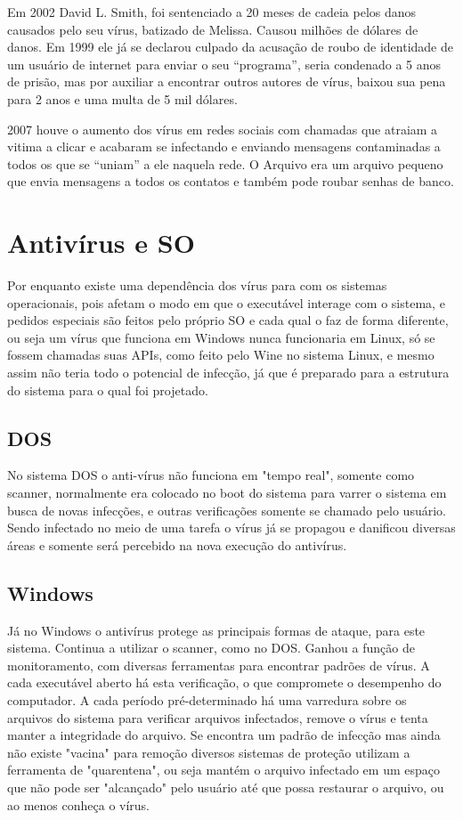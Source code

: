 	Em 2002 David L. Smith, foi sentenciado a 20 meses de cadeia pelos danos causados pelo seu vírus, batizado de Melissa. Causou milhões de dólares de danos. Em 1999 ele já se declarou culpado da acusação de roubo de identidade de um usuário de internet para enviar o seu “programa”, seria condenado a 5 anos de prisão, mas por auxiliar a encontrar outros autores de vírus, baixou sua pena para 2 anos e uma multa de 5 mil dólares.

	2007 houve o aumento dos vírus em redes sociais com chamadas que atraiam a vitima a clicar e acabaram se infectando e enviando mensagens contaminadas a todos os que se “uniam” a ele naquela rede. O Arquivo era um arquivo pequeno que envia mensagens a todos os contatos e também pode roubar senhas de banco.

\section{Antivírus e SO}
	Por enquanto existe uma dependência dos vírus para com os sistemas operacionais, pois afetam o modo em que o executável interage com o sistema, e pedidos especiais são feitos pelo próprio SO e cada qual o faz de forma diferente, ou seja um vírus que funciona em Windows nunca funcionaria em Linux, só se fossem chamadas suas APIs, como feito pelo Wine no sistema Linux, e mesmo assim não teria todo o potencial de infecção, já que é preparado para a estrutura do sistema para o qual foi projetado.

\subsection{DOS}
	No sistema DOS o anti-vírus não funciona em "tempo real", somente como scanner, normalmente era colocado no boot do sistema para varrer o sistema em busca de novas infecções, e outras verificações somente se chamado pelo usuário. Sendo infectado no meio de uma tarefa o vírus já se propagou e danificou diversas áreas e somente será percebido na nova execução do antivírus.

\subsection{Windows}
	Já no Windows o antivírus protege as principais formas de ataque, para este sistema. 
	Continua a utilizar o scanner, como no DOS. 
	Ganhou a função de monitoramento, com diversas ferramentas para encontrar padrões de vírus. 
	A cada executável aberto há esta verificação, o que compromete o desempenho do computador.
	A cada período pré-determinado há uma varredura sobre os arquivos do sistema para verificar arquivos infectados, remove o vírus e tenta manter a integridade do arquivo.
	Se encontra um padrão de infecção mas ainda não existe "vacina" para remoção diversos sistemas de proteção utilizam a ferramenta de "quarentena", ou seja mantém o arquivo infectado em um espaço que não pode ser "alcançado" pelo usuário até que possa restaurar o arquivo, ou ao menos conheça o vírus.

